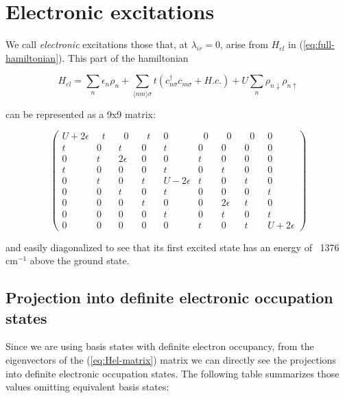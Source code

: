 \chapter{Electronic excitations}
\label{chap:electronic}

We call \textit{electronic} excitations those that, at $\lambda_{ir}=0$, arise from $H_{el}$ in (\ref{eq:full-hamiltonian}). This part of the hamiltonian

\begin{equation}\label{eq:Hel} H_{el} = \sum_n \epsilon_n \rho_n + \sum_{ \langle nm \rangle \sigma } t (c_{n \sigma }^\dagger c_{m \sigma } + H.c.) + U\sum_n \rho_{n\downarrow}\rho_{n\uparrow} \end{equation}

can be represented  as a 9x9 matrix:

\begin{equation}\label{eq:Hel-matrix} \left( \begin{array}{ccccccccc} 
U+2\epsilon &\;\;t\;\;&\;\;0\;\;&\;\;t\;\;&0&\;\;0\;\;&\;\;0\;\;&\;\;0\;\;&0 \\
t&0&t&0&t&0&0&0&0 \\
0&t&2\epsilon &0&0&t&0&0&0 \\
t&0&0&0&t&0&t&0&0 \\
0&t&0&t&U-2\epsilon &t&0&t&0 \\
0&0&t&0&t&0&0&0&t \\
0&0&0&t&0&0&2\epsilon &t&0 \\
0&0&0&0&t&0&t&0&t \\
0&0&0&0&0&t&0&t&U+2\epsilon  \end{array} \right)\end{equation}

and easily diagonalized to see that its first excited state has an energy of ~1376 cm$^{-1}$ above the  ground state.


\section{Projection into definite electronic occupation states}

Since we are using basis states with definite electron occupancy, from the eigenvectors of the (\ref{eq:Hel-matrix}) matrix we can directly see the projections into definite electronic occupation states. The following table summarizes those values omitting equivalent basis states:

